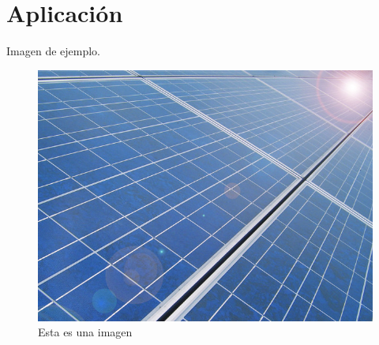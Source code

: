 \chapter{Aplicación}
\label{Aplicación}

Imagen de ejemplo.

\begin{figure}[H]
\begin{center}
\includegraphics[width=1\linewidth,frame]{imagenes/solarpanel.jpg}
\caption{Esta es una imagen}
\label{solarpanel}
\end{center}
\end{figure}